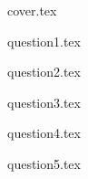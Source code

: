\documentclass{article}
\begin{document}
{cover.tex}

\tableofcontents
\newpage

{question1.tex}

{question2.tex}

{question3.tex}

{question4.tex}

{question5.tex}
\end{document}
